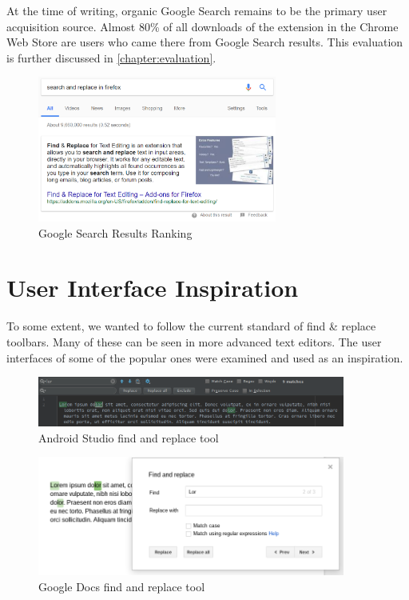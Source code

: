 \documentclass[bsc,frontabs,twoside,singlespacing,parskip,deptreport]{infthesis}
\begin{document}
At the time of writing, organic Google Search remains to be the primary user acquisition source. Almost 80\% of all downloads of the extension in the Chrome Web Store are users who came there from Google Search results. This evaluation is further discussed in \autoref{chapter:evaluation}.

\begin{figure}[h]
\centering
\includegraphics[width=0.7\textwidth]{../docs/search-results.png}
\caption{Google Search Results Ranking}
\end{figure}

\section{User Interface Inspiration}
To some extent, we wanted to follow the current standard of find \& replace toolbars. Many of these can be seen in more advanced text editors. The user interfaces of some of the popular ones were examined and used as an inspiration.

\begin{figure}[hp]
\centering
\includegraphics[width=0.9\textwidth]{../docs/editor-find-and-replace/android-studio-find-and-replace.png}
\caption{Android Studio find and replace tool}
\end{figure}

\begin{figure}[hp]
\centering
\includegraphics[width=0.9\textwidth]{../docs/editor-find-and-replace/gdocs-find-and-replace.png}
\caption{Google Docs find and replace tool}
\end{figure}
\end{document}
